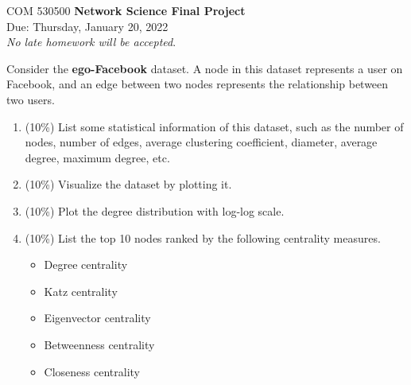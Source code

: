 \documentclass[12pt]{article}
\begin{document}
\thispagestyle{empty}
\begin{center}
{\Large \noindent COM 530500 {\bf Network Science Final Project} \\
\large {{\sc Due:} Thursday, January 20, 2022}  \\
}
\emph{No late homework will be accepted}.
\end{center}





\bigskip



 Consider the {\bf ego-Facebook} \cite{leskovec2012learning} dataset. A node in this dataset represents a user on Facebook, and an edge between two nodes represents the relationship between two users.
\begin{enumerate}[label=(\alph*)]
	\item (10\%) List some statistical information of this dataset, such as the number of nodes, number of edges, average clustering coefficient, diameter, average degree, maximum degree, etc.
	\item (10\%) Visualize the dataset by plotting it.
	\item (10\%) Plot the degree distribution with log-log scale.
	\item (10\%) List the top 10 nodes ranked by the following centrality measures.
	\begin{itemize}
		\item Degree centrality
		\item Katz centrality
		\item Eigenvector centrality
		\item Betweenness centrality
		\item Closeness centrality
	\end{itemize}
\end{enumerate}
\end{document}
